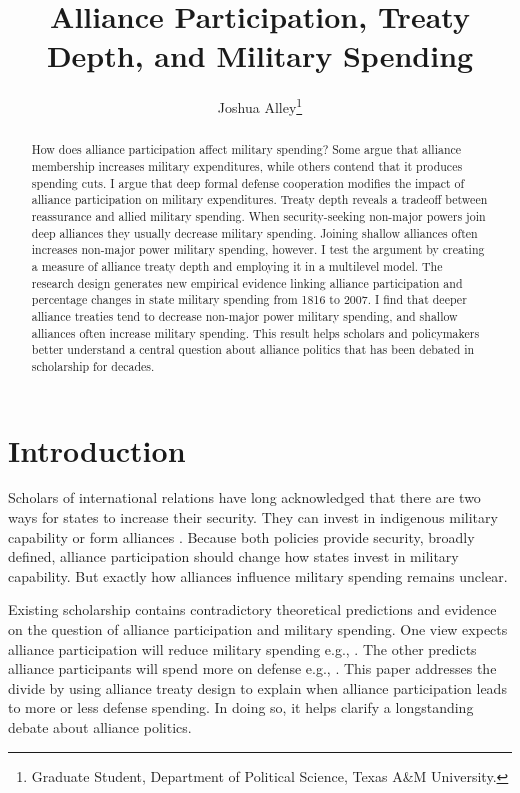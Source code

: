\documentclass[12pt]{article}
\title{\textbf{Alliance Participation, Treaty Depth, and Military Spending}}
\author{Joshua Alley\footnote{Graduate Student,
Department of Political Science, Texas A\&M University.}}
\date{}
\begin{document}
\maketitle 

\doublespace 

\begin{abstract}
How does alliance participation affect military spending? 
Some argue that alliance membership increases military expenditures, while others contend that it produces spending cuts.
I argue that deep formal defense cooperation modifies the impact of alliance participation on military expenditures.  
Treaty depth reveals a tradeoff between reassurance and allied military spending. 
When security-seeking non-major powers join deep alliances they usually decrease military spending.
Joining shallow alliances often increases non-major power military spending, however.    
I test the argument by creating a measure of alliance treaty depth and employing it in a multilevel model. 
The research design generates new empirical evidence linking alliance participation and percentage changes in state military spending from 1816 to 2007. 
I find that deeper alliance treaties tend to decrease non-major power military spending, and shallow alliances often increase military spending.  
This result helps scholars and policymakers better understand a central question about alliance politics that has been debated in scholarship for decades. 
\end{abstract}


\newpage 


\section{Introduction}


Scholars of international relations have long acknowledged that there are two ways for states to increase their security. 
They can invest in indigenous military capability or form alliances \citep{Morgenthau1948, Altfield1984, Morrow1993}.
Because both policies provide security, broadly defined, alliance participation should change how states invest in military capability. 
But exactly how alliances influence military spending remains unclear. 


Existing scholarship contains contradictory theoretical predictions and evidence on the question of alliance participation and military spending. 
One view expects alliance participation will reduce military spending e.g., \citep{Morrow1993, Conybeare1994}. 
The other predicts alliance participants will spend more on defense e.g., \citep{Diehl1994, MorganPalmer2006}.
This paper addresses the divide by using alliance treaty design to explain when alliance participation leads to more or less defense spending. 
In doing so, it helps clarify a longstanding debate about alliance politics.
\end{document}
